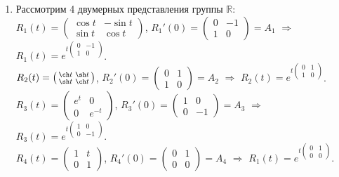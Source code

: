 \documentclass[a4paper]{article}
\begin{document}
\begin{ex}
\begin{enumerate}
  \item Рассмотрим 4 двумерных представления группы $\mathbb{R}$:\\
  $R_1(t)=\left(\begin{smallmatrix} \cos t& -\sin t\\ \sin t& \cos t
  \end{smallmatrix}\right)$, $R_1'(0)=\left(\begin{smallmatrix} 0& -1\\ 1&
  0\end{smallmatrix}\right)=A_1$ $\Rightarrow$ $R_1(t)=e^{t\left(\begin{smallmatrix}
  0& -1\\ 1& 0\end{smallmatrix}\right)}$.\\
  $R_2(t)=\left(\begin{smallmatrix} \ch t& \sh t\\ \sh t& \ch t
  \end{smallmatrix}\right)$, $R_2'(0)=\left(\begin{smallmatrix} 0& 1\\ 1&
  0\end{smallmatrix}\right)=A_2$ $\Rightarrow$ $R_2(t)=e^{t\left(\begin{smallmatrix}
  0& 1\\ 1& 0\end{smallmatrix}\right)}$.\\
  $R_3(t)=\left(\begin{smallmatrix} e^t& 0\\ 0& e^{-t}
  \end{smallmatrix}\right)$, $R_3'(0)=\left(\begin{smallmatrix} 1& 0\\ 0&
  -1\end{smallmatrix}\right)=A_3$ $\Rightarrow$ $R_3(t)=e^{t\left(\begin{smallmatrix}
  1& 0\\ 0& -1\end{smallmatrix}\right)}$.\\
  $R_4(t)=\left(\begin{smallmatrix} 1& t\\ 0& 1
  \end{smallmatrix}\right)$, $R_4'(0)=\left(\begin{smallmatrix} 0& 1\\ 0&
  0\end{smallmatrix}\right)=A_4$ $\Rightarrow$ $R_1(t)=e^{t\left(\begin{smallmatrix}
  0& 1\\ 0& 0\end{smallmatrix}\right)}$.
\end{enumerate}
\end{ex}
\end{document}
